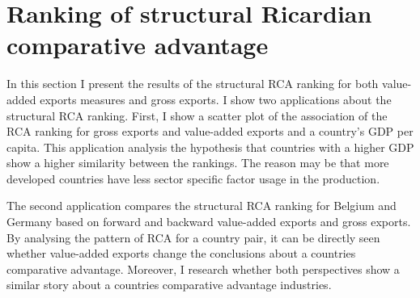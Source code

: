 \section{Ranking of structural Ricardian comparative advantage }
In this section I present the results of the structural RCA ranking for both value-added exports measures and gross exports.
I show two applications about the structural RCA ranking.
First, I show a scatter plot of the association of the RCA ranking for gross exports and value-added exports and a country's GDP per capita.
This application analysis the hypothesis that countries with a higher GDP show a higher similarity between the rankings.
The reason may be that more developed countries have less sector specific factor usage in the production. \par
The second application compares the structural RCA ranking for Belgium and Germany based on forward and backward value-added exports and gross exports.
By analysing the pattern of RCA for a country pair, it can be directly seen whether value-added exports change the conclusions about a countries comparative advantage.
Moreover, I research whether both perspectives show a similar story about a countries comparative advantage industries.
